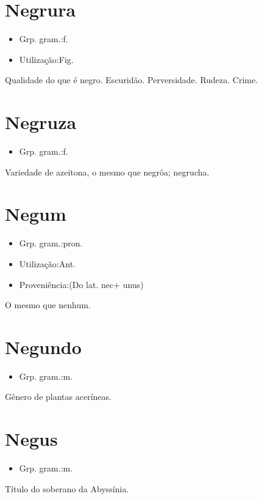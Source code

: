 \section{Negrura}
\begin{itemize}
\item {Grp. gram.:f.}
\end{itemize}
\begin{itemize}
\item {Utilização:Fig.}
\end{itemize}
Qualidade do que é negro.
Escuridão.
Perversidade.
Rudeza.
Crime.
\section{Negruza}
\begin{itemize}
\item {Grp. gram.:f.}
\end{itemize}
Variedade de azeitona, o mesmo que \textunderscore negrôa\textunderscore ; negrucha.
\section{Negum}
\begin{itemize}
\item {Grp. gram.:pron.}
\end{itemize}
\begin{itemize}
\item {Utilização:Ant.}
\end{itemize}
\begin{itemize}
\item {Proveniência:(Do lat. \textunderscore nec\textunderscore  + \textunderscore unus\textunderscore )}
\end{itemize}
O mesmo que \textunderscore nenhum\textunderscore .
\section{Negundo}
\begin{itemize}
\item {Grp. gram.:m.}
\end{itemize}
Gênero de plantas aceríneas.
\section{Negus}
\begin{itemize}
\item {Grp. gram.:m.}
\end{itemize}
Título do soberano da Abyssínia.
